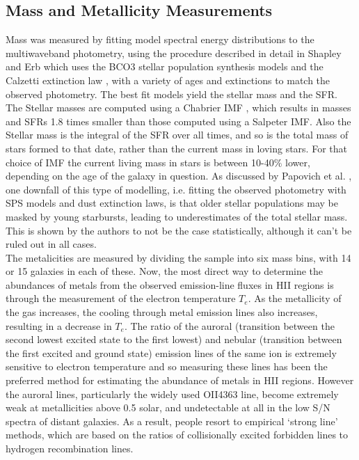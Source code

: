 \documentclass{literature}
\begin{document}
\subsection{Mass and Metallicity Measurements}
Mass was measured by fitting model spectral energy distributions to the multiwaveband photometry, using the procedure described in detail in Shapley \citep{Shapley_2005} and Erb \citep{Erb_2006a} which uses the BCO3 \citep{Bruzual2003} stellar population synthesis models and the Calzetti extinction law \citep{Calzetti2000}, with a variety of ages and extinctions to match the observed photometry. The best fit models yield the stellar mass and the SFR. The Stellar masses are computed using a Chabrier IMF \citep{Chabrier2003}, which results in masses and SFRs 1.8 times smaller than those computed using a Salpeter IMF. Also the Stellar mass is the integral of the SFR over all times, and so is the total mass of stars formed to that date, rather than the current mass in loving stars. For that choice of IMF the current living mass in stars is between 10-40$\%$
lower, depending on the age of the galaxy in question. As discussed by Papovich et al. \citep{Papovich2001}, one downfall of this type of modelling, i.e. fitting the observed photometry with SPS models and dust extinction laws, is that older stellar populations may be masked by young starbursts, leading to underestimates of the total stellar mass. This is shown by the authors to not be the case statistically, although it can't be ruled out in all cases. \\ 
The metalicities are measured by dividing the sample into six mass bins, with 14 or 15 galaxies in each of these. Now, the most direct way to determine the abundances of metals from the observed emission-line fluxes in HII regions is through the measurement of the electron temperature $T_{e}$. As the metallicity of the gas increases, the cooling through metal emission lines also increases, resulting in a decrease in $T_{e}$. The ratio of the auroral (transition between the second lowest excited state to the first lowest) and nebular (transition between the first excited and ground state) emission lines of the same ion is extremely sensitive to electron temperature and so measuring these lines has been the preferred method for estimating the abundance of metals in HII regions. However the auroral lines, particularly the widely used OII4363 line, become extremely weak at metallicities above 0.5 solar, and undetectable at all in the low S/N spectra of distant galaxies. As a result, people resort to empirical `strong line' methods, which are based on the ratios of collisionally excited forbidden lines to hydrogen recombination lines. 
\end{document}
